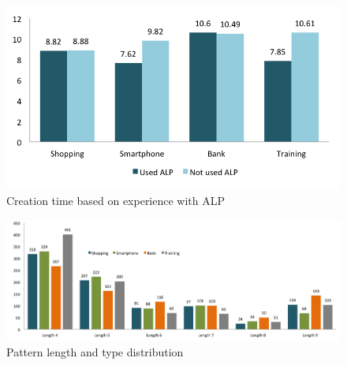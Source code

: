 {{    %
    \begin{figure}[H]
      \centering
    \end{figure}

    \begin{figure}[H]
      \centering
      \includegraphics[scale=0.65]{pics/analysis/usedALPpatterncreationtime.png}
      \caption{Creation time based on experience with ALP}
      \label{fig:usedALPpatterncreationtime}
    \end{figure}

    \begin{figure}[H]
      \centering
      \includegraphics[width=\textwidth]{pics/analysis/patterntypePatternLength.png}
      \caption{Pattern length and type distribution}
      \label{fig:patternTypePatternLength}
    \end{figure}

}}
